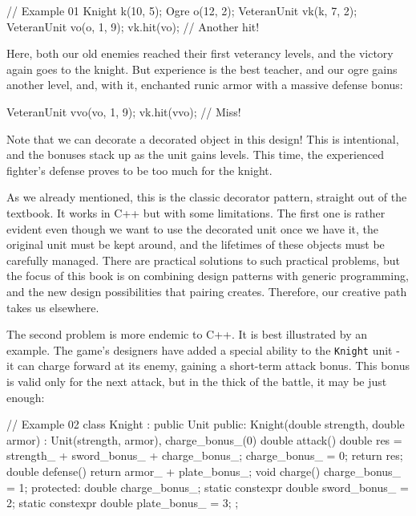 \begin{code}
// Example 01
Knight k(10, 5);
Ogre o(12, 2);
VeteranUnit vk(k, 7, 2);
VeteranUnit vo(o, 1, 9);
vk.hit(vo); // Another hit!
\end{code}

Here, both our old enemies reached their first veterancy levels, and the victory again goes to the knight. But experience is the best teacher, and our ogre gains another level, and, with it, enchanted runic armor with a massive defense bonus:

\begin{code}
VeteranUnit vvo(vo, 1, 9);
vk.hit(vvo); // Miss!
\end{code}

Note that we can decorate a decorated object in this design! This is intentional, and the bonuses stack up as the unit gains levels. This time, the experienced fighter's defense proves to be too much for the knight.

As we already mentioned, this is the classic decorator pattern, straight out of the textbook. It works in C++ but with some limitations. The first one is rather evident even though we want to use the decorated unit once we have it, the original unit must be kept around, and the lifetimes of these objects must be carefully managed. There are practical solutions to such practical problems, but the focus of this book is on combining design patterns with generic programming, and the new design possibilities that pairing creates. Therefore, our creative path takes us elsewhere.

The second problem is more endemic to C++. It is best illustrated by an example. The game's designers have added a special ability to the \texttt{Knight} unit - it can charge forward at its enemy, gaining a short-term attack bonus. This bonus is valid only for the next attack, but in the thick of the battle, it may be just enough:

\begin{code}
// Example 02
class Knight : public Unit {
  public:
  Knight(double strength, double armor) :
  Unit(strength, armor), charge_bonus_(0) {}
  double attack() {
    double res = strength_ + sword_bonus_ + charge_bonus_;
    charge_bonus_ = 0;
    return res;
  }
  double defense() { return armor_ + plate_bonus_; }
  void charge() { charge_bonus_ = 1; }
  protected:
  double charge_bonus_;
  static constexpr double sword_bonus_ = 2;
  static constexpr double plate_bonus_ = 3;
};
\end{code}

